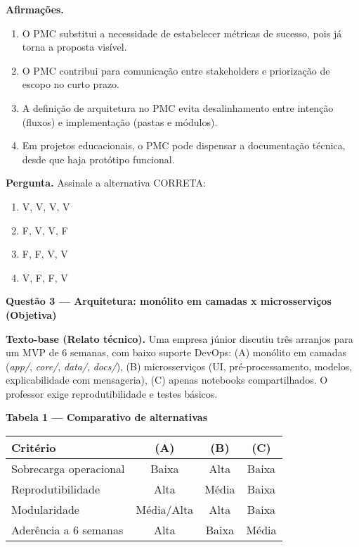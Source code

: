 \documentclass[12pt,a4paper]{article}
\begin{document}
\noindent\textbf{Afirmações.}
\begin{enumerate}[label=\Roman*.]
\item O PMC substitui a necessidade de estabelecer métricas de sucesso, pois já torna a proposta visível.
\item O PMC contribui para comunicação entre stakeholders e priorização de escopo no curto prazo.
\item A definição de arquitetura no PMC evita desalinhamento entre intenção (fluxos) e implementação (pastas e módulos).
\item Em projetos educacionais, o PMC pode dispensar a documentação técnica, desde que haja protótipo funcional.
\end{enumerate}

\noindent\textbf{Pergunta.} Assinale a alternativa CORRETA:
\begin{enumerate}[label=\alph*)]
\item V, V, V, V \qquad
\item F, V, V, F \qquad
\item F, F, V, V \qquad
\item V, F, F, V
\end{enumerate}

\newpage
\noindent\textbf{Questão 3 — Arquitetura: monólito em camadas x microsserviços (Objetiva)}
\par\noindent\textbf{Texto-base (Relato técnico).} Uma empresa júnior discutiu três arranjos para um MVP de 6 semanas, com baixo suporte DevOps: (A) monólito em camadas (\textit{app/}, \textit{core/}, \textit{data/}, \textit{docs/}), (B) microsserviços (UI, pré-processamento, modelos, explicabilidade com mensageria), (C) apenas notebooks compartilhados. O professor exige reprodutibilidade e testes básicos.

\vspace{0.5em}
\noindent\textbf{Tabela 1 — Comparativo de alternativas}
\begin{center}
\begin{tabular}{lccc}
\toprule
\textbf{Critério} & \textbf{(A)} & \textbf{(B)} & \textbf{(C)}\\
\midrule
Sobrecarga operacional & Baixa & Alta & Baixa \\
Reprodutibilidade & Alta & Média & Baixa \\
Modularidade & Média/Alta & Alta & Baixa \\
Aderência a 6 semanas & Alta & Baixa & Média \\
\bottomrule
\end{tabular}
\end{center}
\end{document}
